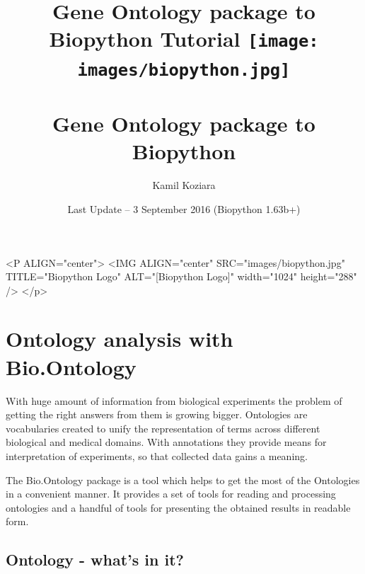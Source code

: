 \documentclass{report}
\begin{document}
\begin{htmlonly}
\title{Gene Ontology package to Biopython Tutorial}
\end{htmlonly}
\begin{latexonly}
\title{
\texttt{[image: images/biopython.jpg]}\\
~\\
Gene Ontology package to Biopython}
\end{latexonly}

\author{Kamil Koziara}
\date{Last Update -- 3 September 2016 (Biopython 1.63b+)}

\begin{rawhtml}
<P ALIGN="center">
<IMG ALIGN="center" SRC="images/biopython.jpg" TITLE="Biopython Logo" ALT="[Biopython Logo]" width="1024" height="288" />
</p>
\end{rawhtml}

\maketitle
\tableofcontents


\chapter{Ontology analysis with Bio.Ontology}

\label{sec:Ontology}

With huge amount of information from biological experiments the problem of
getting the right answers from them is growing bigger. Ontologies are
vocabularies created to unify the representation of terms across different
biological and medical domains. With annotations they provide means for
interpretation of experiments, so that collected data gains a meaning.

The Bio.Ontology package is a tool which helps to get the most of the
Ontologies in a convenient manner. It provides a set of tools for reading
and processing ontologies and a handful of tools for presenting the obtained
results in readable form.

\section{Ontology - what's in it?}
\label{sec:demo}
\end{document}
